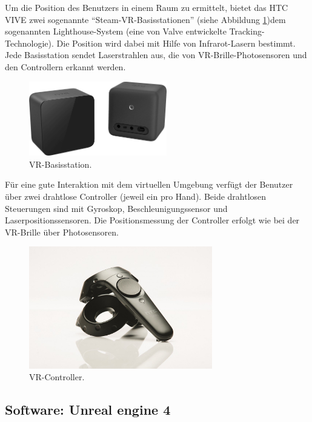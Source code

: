 Um die Position des Benutzers in einem Raum zu ermittelt, bietet das HTC VIVE zwei sogenannte ``Steam-VR-Basisstationen'' (siehe Abbildung \ref{vr-base})dem sogenannten Lighthouse-System (eine von Valve entwickelte Tracking-Technologie). 
Die Position wird dabei mit Hilfe von Infrarot-Lasern bestimmt. 
Jede Basisstation sendet Laserstrahlen aus, die von VR-Brille-Photosensoren und den Controllern erkannt werden. \\


\begin{figure}[h] \centering
\includegraphics[width=6cm]{Images/vr-base.png} 
\caption[VR-Basisstation]{ VR-Basisstation\cite{vive19}. }
\label{vr-base} 
\end{figure}


F{\"u}r eine gute Interaktion mit dem virtuellen Umgebung verf{\"u}gt der Benutzer {\"u}ber zwei  drahtlose Controller (jeweil ein pro Hand). 
Beide drahtlosen Steuerungen sind mit Gyroskop, Beschleunigungssensor und Laserpositionssensoren. 
Die Positionsmessung der Controller erfolgt wie bei der VR-Brille {\"u}ber  Photosensoren. \\


\begin{figure}[h] \centering
\includegraphics[width=8cm]{Images/vr-controller.png} 
\caption[VR-Controller]{ VR-Controller\cite{vive19}. }
\label{vr-controller} 
\end{figure}




\subsection{Software: Unreal engine 4} \label{vr-software}

